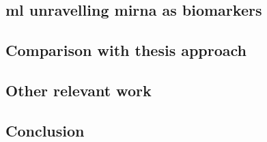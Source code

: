 \subsection{\gls{ml} unravelling \gls{mirna} as biomarkers}

\subsection{Comparison with thesis approach}

\subsection{Other relevant work}

\subsection{Conclusion}
